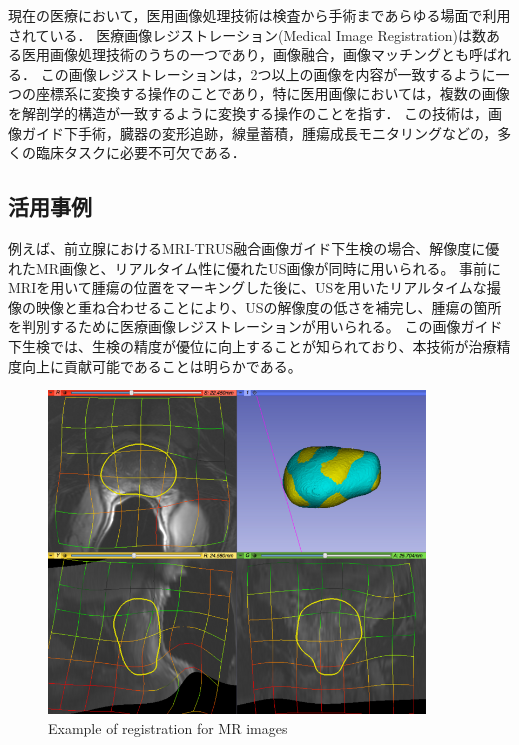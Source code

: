 現在の医療において，医用画像処理技術は検査から手術まであらゆる場面で利用されている．
医療画像レジストレーション(Medical Image Registration)は数ある医用画像処理技術のうちの一つであり，画像融合，画像マッチングとも呼ばれる．
この画像レジストレーションは，2つ以上の画像を内容が一致するように一つの座標系に変換する操作のことであり，特に医用画像においては，複数の画像を解剖学的構造が一致するように変換する操作のことを指す．
この技術は，画像ガイド下手術，臓器の変形追跡，線量蓄積，腫瘍成長モニタリングなどの，多くの臨床タスクに必要不可欠である．

\subsection{活用事例}
    例えば、前立腺におけるMRI-TRUS融合画像ガイド下生検\cite{marks2013mri}の場合、解像度に優れたMR画像と、リアルタイム性に優れたUS画像が同時に用いられる。
    事前にMRIを用いて腫瘍の位置をマーキングした後に、USを用いたリアルタイムな撮像の映像と重ね合わせることにより、USの解像度の低さを補完し、腫瘍の箇所を判別するために医療画像レジストレーションが用いられる。
    この画像ガイド下生検では、生検の精度が優位に向上することが知られており\cite{shoji2015manually}、本技術が治療精度向上に貢献可能であることは明らかである。
    \begin{figure}[ht]
      \centering
      \includegraphics[width=10cm]{1_intro/img/MapBasedRegistration.png}
      \caption{Example of registration for MR images}
    \end{figure}

